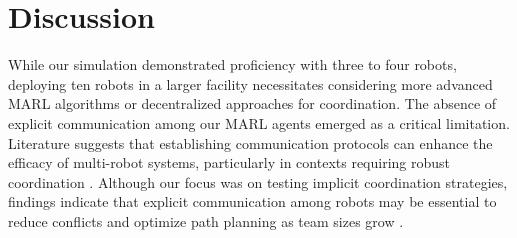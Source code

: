 \documentclass[conference]{IEEEtran}
\begin{document}
\section{Discussion}
\label{sec:discussion}
While our simulation demonstrated proficiency with three to four robots, deploying ten robots in a larger facility necessitates considering more advanced MARL algorithms or decentralized approaches for coordination. The absence of explicit communication among our MARL agents emerged as a critical limitation. Literature suggests that establishing communication protocols can enhance the efficacy of multi-robot systems, particularly in contexts requiring robust coordination \citep{ztouni2021, ivanovic2019}. Although our focus was on testing implicit coordination strategies, findings indicate that explicit communication among robots may be essential to reduce conflicts and optimize path planning as team sizes grow \citep{liu2023}.
\end{document}
